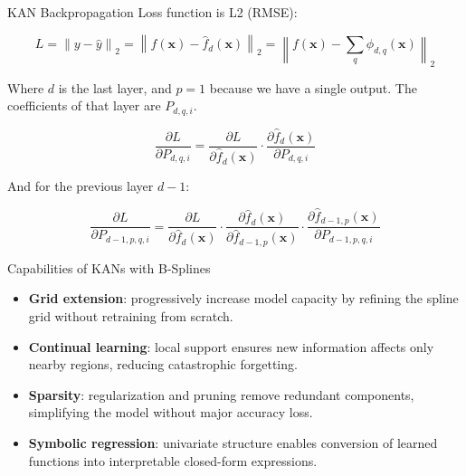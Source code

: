 \documentclass[aspectratio=169]{beamer}
\begin{document}

\begin{frame}{KAN Backpropagation}
	Loss function is L2 (RMSE): 
	
	\begin{equation*}
		L = \left\| y - \hat{y} \right\|_2 = \left\| f(\mathbf{x}) - \hat{f}_{d}(\mathbf{x}) \right\|_2 = \left\| f(\mathbf{x}) - \sum_q \phi_{d,q}(\mathbf{x}) \right\|_2
	\end{equation*}
	
	Where $d$ is the last layer, and $p=1$ because we have a single output. The coefficients of that layer are $P_{d,q,i}$.
	
	\begin{equation*}
		\frac{\partial L}{\partial P_{d,q,i}} = \frac{\partial L}{\partial \hat{f}_{d}(\mathbf{x})} \cdot \frac{\partial \hat{f}_{d}(\mathbf{x})}{\partial P_{d,q,i}} 
	\end{equation*}
	
	And for the previous layer $d-1$:
	
	\begin{equation*}
		\frac{\partial L}{\partial P_{d-1,p,q,i}} = \frac{\partial L}{\partial \hat{f}_{d}(\mathbf{x})} \cdot \frac{\partial \hat{f}_{d}(\mathbf{x})}{\partial \hat{f}_{d-1,p}(\mathbf{x})} \cdot \frac{\partial \hat{f}_{d-1,p}(\mathbf{x})}{\partial P_{d-1,p,q,i}} 
	\end{equation*}
	
\end{frame}


\begin{frame}{Capabilities of KANs with B-Splines}
	
	\begin{itemize}
		\item \textbf{Grid extension}: progressively increase model capacity by refining the spline grid without retraining from scratch.
		\item \textbf{Continual learning}: local support ensures new information affects only nearby regions, reducing catastrophic forgetting.
		\item \textbf{Sparsity}: regularization and pruning remove redundant components, simplifying the model without major accuracy loss.
		\item \textbf{Symbolic regression}: univariate structure enables conversion of learned functions into interpretable closed-form expressions.
	\end{itemize}
	
\end{frame}
\end{document}

